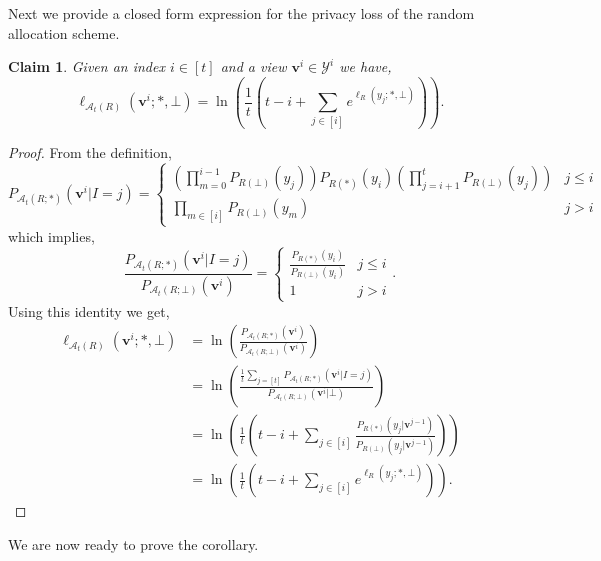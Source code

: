 \documentclass{article}
\theoremstyle{plain}
\newtheorem{claim}[theorem]{Claim}
\theoremstyle{definition}
\newcommand{\out}{y}
\newcommand{\outDom}{\mathcal{Y}}
\newcommand{\rand}{R}
\newcommand{\view}{\boldsymbol{v}}
\newcommand{\lossAlg}[4]{\ell_{#1}\left(#2; #3, #4 \right)}
\newcommand{\alloc}[2]{\mathcal{A}_{#1}\left(#2\right)}
\newcommand{\allocFunc}[3]{\mathcal{A}_{#1}\left(#2; #3\right)}
\begin{document}
Next we provide a closed form expression for the privacy loss of the random allocation scheme.
\begin{claim}\label{clm:randAlocPrivLoss}
    Given an index $i \in [t]$ and a view $\view^{i} \in \outDom^{i}$ we have,
    \[
        \lossAlg{\alloc{t}{\rand}}{\view^{i}}{*}{\bot} = \ln\left(\frac{1}{t} \left(t-i + \sum_{j \in [i]} e^{\lossAlg{\rand}{\out_{j}}{*}{\bot}}\right) \right).
    \]
\end{claim}

\begin{proof}
    From the definition,
    \[
        P_{\allocFunc{t}{\rand}{*}}(\view^{i} \vert I=j) = \begin{cases}
            \left( \prod_{m = 0}^{i-1} P_{\rand(\bot)}(\out_{j}) \right) P_{\rand(*)}(\out_{i}) \left( \prod_{j = i+1}^{t} P_{\rand(\bot)}(\out_{j}) \right) & j \le i
            \\ \prod_{m \in [i]} P_{\rand(\bot)}(\out_{m}) & j > i
        \end{cases}
    \]
    which implies,
    \[
        \frac{P_{\allocFunc{t}{\rand}{*}}(\view^{i} \vert I=j)}{P_{\allocFunc{t}{\rand}{\bot}}(\view^{i})} = \begin{cases}
            \frac{P_{\rand(*)}(\out_{i})}{P_{\rand(\bot)}(\out_{i})} & j \le i
            \\1 & j > i
        \end{cases}.
    \]
    Using this identity we get,
    \begin{align*}
        \lossAlg{\alloc{t}{\rand}}{\view^{i}}{*}{\bot} & = \ln\left(\frac{P_{\allocFunc{t}{\rand}{*}}(\view^{i})}{P_{\allocFunc{t}{\rand}{\bot}}(\view^{i})} \right)
        \\ & = \ln\left(\frac{\frac{1}{t} \sum_{j=[t]} P_{\allocFunc{t}{\rand}{*}}(\view^{i} \vert I=j)}{P_{\allocFunc{t}{\rand}{\bot}}(\view^{i} \vert \bot)} \right)
        \\ & = \ln\left(\frac{1}{t} \left(t-i + \sum_{j \in [i]} \frac{P_{\rand(*)}(\out_{j} \vert \view^{j-1}) }{P_{\rand(\bot)}(\out_{j} \vert \view^{j-1})} \right) \right)
        \\ & = \ln\left(\frac{1}{t} \left(t-i + \sum_{j \in [i]} e^{\lossAlg{\rand}{\out_{j}}{*}{\bot}} \right) \right).
    \end{align*}
\end{proof}
We are now ready to prove the corollary.
\end{document}
